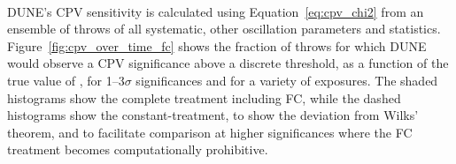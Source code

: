 \begin{figure*}[htbp]
  \centering
  \captionsetup[subfloat]{captionskip=-4pt}
  \\
  \caption{Fraction of throws for which significance of DUNE's CP-violation test ($\deltacp \neq \{0,\pm\pi\}$) exceeds 1--3$\sigma$, calculated using both the FC (shaded histograms) and constant-\dchisq (dashed lines) methods, as a function of the true value of \deltacp. Shown for NO, for a number of different exposures. The number of throws used to make each figure is also shown.}
  \label{fig:cpv_over_time_fc}
\end{figure*}
DUNE's CPV sensitivity is calculated using Equation~\ref{eq:cpv_chi2} from an ensemble of throws of all systematic, other oscillation parameters and statistics. Figure~\ref{fig:cpv_over_time_fc} shows the fraction of throws for which DUNE would observe a CPV significance above a discrete threshold, as a function of the true value of \deltacp, for 1--3$\sigma$ significances and for a variety of exposures. The shaded histograms show the complete treatment including FC, while the dashed histograms show the constant-\dchisq treatment, to show the deviation from Wilks' theorem, and to facilitate comparison at higher significances where the FC treatment becomes computationally prohibitive.


